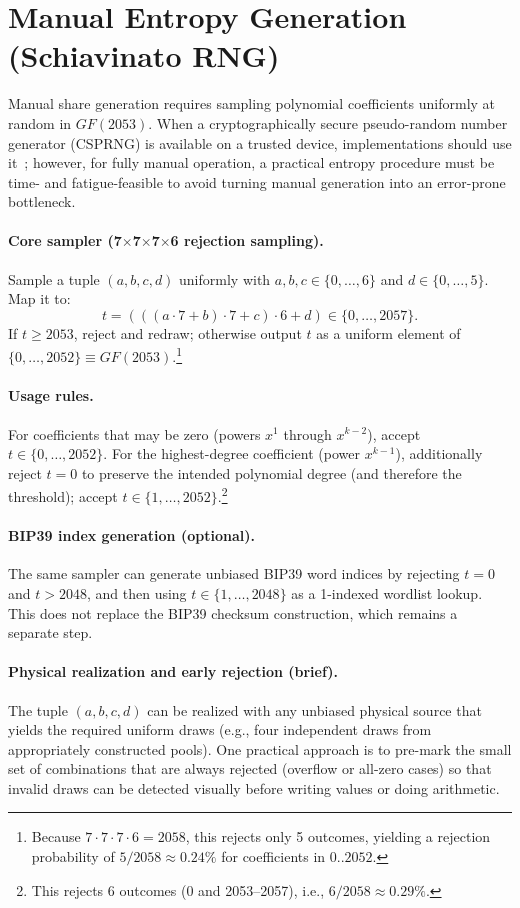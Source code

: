 \documentclass[11pt]{article}
\begin{document}
\section{Manual Entropy Generation (Schiavinato RNG)}
\label{app:manual-rng}

Manual share generation requires sampling polynomial coefficients uniformly at random in $GF(2053)$. When a cryptographically secure pseudo-random number generator (CSPRNG) is available on a trusted device, implementations should use it~\cite{rfc4086}; however, for fully manual operation, a practical entropy procedure must be time- and fatigue-feasible to avoid turning manual generation into an error-prone bottleneck.

\paragraph{Core sampler (7$\times$7$\times$7$\times$6 rejection sampling).} Sample a tuple $(a,b,c,d)$ uniformly with $a,b,c\in\{0,\ldots,6\}$ and $d\in\{0,\ldots,5\}$. Map it to:
\[
t = (((a\cdot 7 + b)\cdot 7 + c)\cdot 6 + d)\in\{0,\ldots,2057\}.
\]
If $t \ge 2053$, reject and redraw; otherwise output $t$ as a uniform element of $\{0,\ldots,2052\}\equiv GF(2053)$.\footnote{Because $7\cdot 7\cdot 7\cdot 6 = 2058$, this rejects only 5 outcomes, yielding a rejection probability of $5/2058\approx 0.24\%$ for coefficients in $0..2052$.}

\paragraph{Usage rules.} For coefficients that may be zero (powers $x^1$ through $x^{k-2}$), accept $t\in\{0,\ldots,2052\}$. For the highest-degree coefficient (power $x^{k-1}$), additionally reject $t=0$ to preserve the intended polynomial degree (and therefore the threshold); accept $t\in\{1,\ldots,2052\}$.\footnote{This rejects 6 outcomes (0 and 2053--2057), i.e., $6/2058\approx 0.29\%$.}

\paragraph{BIP39 index generation (optional).} The same sampler can generate unbiased BIP39 word indices by rejecting $t=0$ and $t>2048$, and then using $t\in\{1,\ldots,2048\}$ as a 1-indexed wordlist lookup. This does not replace the BIP39 checksum construction, which remains a separate step.

\paragraph{Physical realization and early rejection (brief).} The tuple $(a,b,c,d)$ can be realized with any unbiased physical source that yields the required uniform draws (e.g., four independent draws from appropriately constructed pools). One practical approach is to pre-mark the small set of combinations that are always rejected (overflow or all-zero cases) so that invalid draws can be detected visually before writing values or doing arithmetic.
\end{document}
